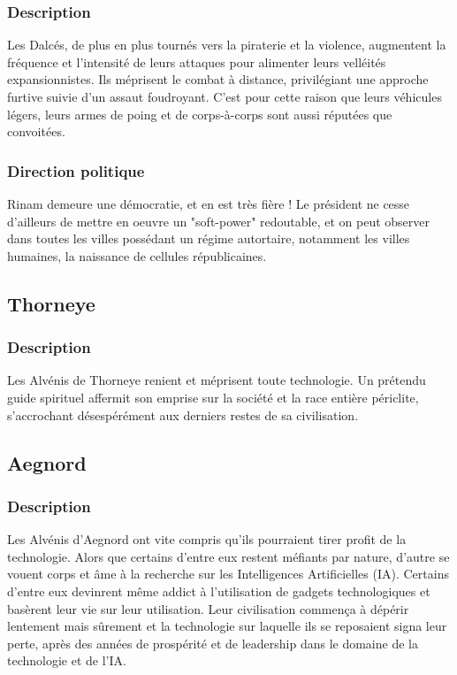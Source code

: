 \subsubsection{Description}
Les Dalcés, de plus en plus tournés vers la piraterie et la violence, augmentent la fréquence et l'intensité de leurs attaques pour alimenter leurs velléités expansionnistes. Ils méprisent le combat à distance, privilégiant une approche furtive suivie d'un assaut foudroyant. C'est pour cette raison que leurs véhicules légers, leurs armes de poing et de corps-à-corps sont aussi réputées que convoitées.
\subsubsection{Direction politique}
Rinam demeure une démocratie, et en est très fière ! Le président ne cesse d'ailleurs de mettre en oeuvre un "soft-power" redoutable, et on peut observer dans toutes les villes possédant un régime autortaire, notamment les villes humaines, la naissance de cellules républicaines.
\subsection{Thorneye}
\subsubsection{Description}
Les Alvénis de Thorneye renient et méprisent toute technologie. Un prétendu guide spirituel affermit son emprise sur la société et la race entière périclite, s'accrochant désespérément aux derniers restes de sa civilisation.
\subsection{Aegnord} 
\subsubsection{Description}
Les Alvénis d'Aegnord ont vite compris qu'ils pourraient tirer profit de la technologie. Alors que certains d'entre eux restent méfiants par nature, d'autre se vouent corps et âme à la recherche sur les Intelligences Artificielles (IA). Certains d'entre eux devinrent même addict à l'utilisation de gadgets technologiques et basèrent leur vie sur leur utilisation. Leur civilisation commença à dépérir lentement mais sûrement et la technologie sur laquelle ils se reposaient signa leur perte, après des années de prospérité et de leadership dans le domaine de la technologie et de l'IA.
